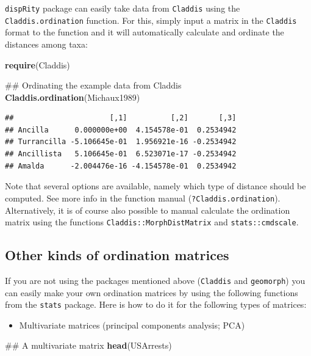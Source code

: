 \documentclass[]{book}
\newenvironment{Shaded}{\begin{snugshade}}{\end{snugshade}}
\newcommand{\KeywordTok}[1]{\textcolor[rgb]{0.13,0.29,0.53}{\textbf{#1}}}
\newcommand{\NormalTok}[1]{#1}
\providecommand{\tightlist}{%
  \setlength{\itemsep}{0pt}\setlength{\parskip}{0pt}}
\theoremstyle{definition}
\theoremstyle{definition}
\theoremstyle{definition}
\theoremstyle{remark}
\begin{document}
\texttt{dispRity} package can easily take data from \texttt{Claddis}
using the \texttt{Claddis.ordination} function. For this, simply input a
matrix in the \texttt{Claddis} format to the function and it will
automatically calculate and ordinate the distances among taxa:

\begin{Shaded}
\begin{Highlighting}[]
\KeywordTok{require}\NormalTok{(Claddis)}

\NormalTok{## Ordinating the example data from Claddis}
\KeywordTok{Claddis.ordination}\NormalTok{(Michaux1989) }
\end{Highlighting}
\end{Shaded}

\begin{verbatim}
##                      [,1]          [,2]       [,3]
## Ancilla      0.000000e+00  4.154578e-01  0.2534942
## Turrancilla -5.106645e-01  1.956921e-16 -0.2534942
## Ancillista   5.106645e-01  6.523071e-17 -0.2534942
## Amalda      -2.004476e-16 -4.154578e-01  0.2534942
\end{verbatim}

Note that several options are available, namely which type of distance
should be computed. See more info in the function manual
(\texttt{?Claddis.ordination}). Alternatively, it is of course also
possible to manual calculate the ordination matrix using the functions
\texttt{Claddis::MorphDistMatrix} and \texttt{stats::cmdscale}.

\subsection{Other kinds of ordination
matrices}\label{other-kinds-of-ordination-matrices}

If you are not using the packages mentioned above (\texttt{Claddis} and
\texttt{geomorph}) you can easily make your own ordination matrices by
using the following functions from the \texttt{stats} package. Here is
how to do it for the following types of matrices:

\begin{itemize}
\tightlist
\item
  Multivariate matrices (principal components analysis; PCA)
\end{itemize}

\begin{Shaded}
\begin{Highlighting}[]
\NormalTok{## A multivariate matrix}
\KeywordTok{head}\NormalTok{(USArrests)}
\end{Highlighting}
\end{Shaded}
\end{document}

